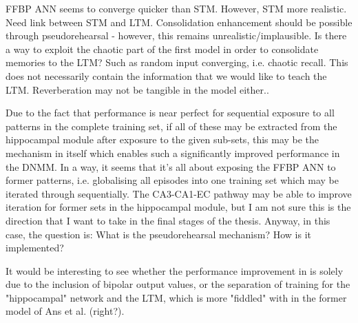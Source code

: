 FFBP ANN seems to converge quicker than STM. However, STM more realistic. Need link between STM and LTM. Consolidation enhancement should be possible through pseudorehearsal - however, this remains unrealistic/implausible.
Is there a way to exploit the chaotic part of the first model in order to consolidate memories to the LTM? Such as random input converging, i.e. chaotic recall. This does not necessarily contain the information that we would like to teach the LTM. Reverberation may not be tangible in the model either..

Due to the fact that performance is near perfect for sequential exposure to all patterns in the complete training set, if all of these may be extracted from the hippocampal module after exposure to the given sub-sets, this may be the mechanism in itself which enables such a significantly improved performance in the DNMM. In a way, it seems that it's all about exposing the FFBP ANN to former patterns, i.e. globalising all episodes into one training set which may be iterated through sequentially. The CA3-CA1-EC pathway may be able to improve iteration for former sets in the hippocampal module, but I am not sure this is the direction that I want to take in the final stages of the thesis. Anyway, in this case, the question is: What is the pseudorehearsal mechanism? How is it implemented?

It would be interesting to see whether the performance improvement in \cite{Hattori2010, Hattori2014} is solely due to the inclusion of bipolar output values, or the separation of training for the "hippocampal" network and the LTM, which is more "fiddled" with in the former model of Ans et al. (right?).

\cleardoublepage